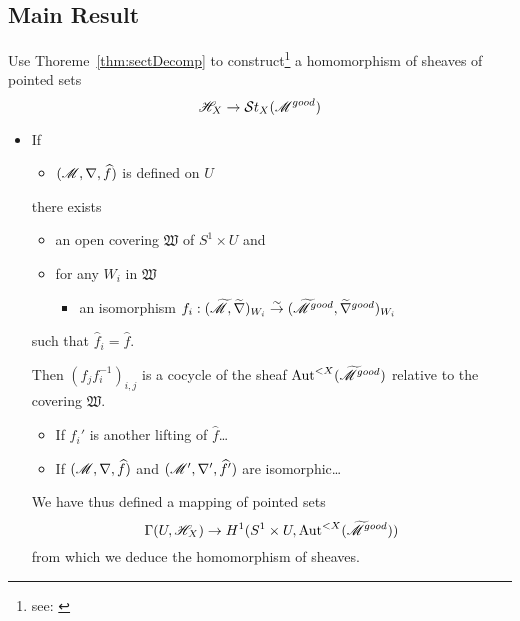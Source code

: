 \subsection{Main Result}
Use Thoreme~\ref{thm:sectDecomp} to construct\footnote{see:
\cite[p. 111f]{sabbah2007isomonodromic}} a homomorphism of sheaves of
pointed sets
\[
  \mathscr{H}_X\to\mathcal{S}{}t_X(\mathscr{M}^{good})
\]
\begin{itemize}
  \item If \begin{itemize}
      \item $(\mathscr{M},\nabla,\widehat f)$ is defined on $U$
    \end{itemize}
    there exists
    \begin{itemize}
      \item an open covering $\mathfrak{W}$ of $S^1\times U$ and
      \item for any $W_i$ in $\mathfrak{W}$
        \begin{itemize}
          \item an isomorphism
            $f_i:(\widetilde{\mathscr{M}},\widetilde\nabla)_{W_i}
              \overset{\sim}{\to}
              (\widetilde{\mathscr{M}}^{good},\widetilde\nabla^{good})_{W_i}$
        \end{itemize}
    \end{itemize}
    such that $\hat f_i=\hat f$.

    Then $(f_jf_i^{-1})_{i,j}$ is a cocycle of the sheaf
    $\operatorname{Aut}^{<X}(\widetilde{\mathscr{M}}^{good})$ relative to the covering $\mathfrak{W}$.
    \begin{itemize}
      \item If $f_i'$ is another lifting of $\hat f$\dots
      \item If $(\mathscr{M},\nabla,\widehat f)$ and $(\mathscr{M}',\nabla',\widehat f')$ are
        isomorphic\dots
    \end{itemize}
    We have thus defined a mapping of pointed sets
    \[
      \Gamma(U,\mathscr{H}_X)\to H^1(S^1\times U,\operatorname{Aut}^{<X}(\widetilde{\mathscr{M}}^{good}))
    \]
    from which we deduce the homomorphism of sheaves.
\end{itemize}

